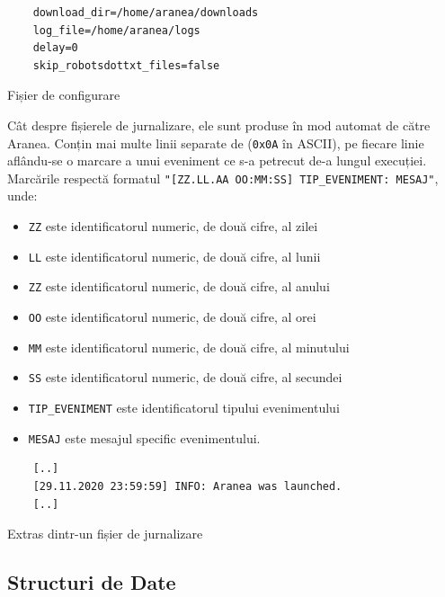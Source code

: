 \documentclass[12pt]{article}
\begin{document}
\begin{listing}[ht]
    \begin{verbatim}
    download_dir=/home/aranea/downloads
    log_file=/home/aranea/logs
    delay=0
    skip_robotsdottxt_files=false
    \end{verbatim}
    \caption{Fișier de configurare}
    \label{listing:1}
\end{listing}

Cât despre fișierele de jurnalizare, ele sunt produse în mod automat de către Aranea. Conțin mai multe linii separate de \texttt{\n} (\texttt{0x0A} în ASCII), pe fiecare linie aflându-se o marcare a unui eveniment ce s-a petrecut de-a lungul execuției. Marcările respectă formatul \texttt{"[ZZ.LL.AA OO:MM:SS] TIP_EVENIMENT: MESAJ"}, unde:
\begin{itemize}
    \item \texttt{ZZ} este identificatorul numeric, de două cifre, al zilei
    \item \texttt{LL} este identificatorul numeric, de două cifre, al lunii
    \item \texttt{ZZ} este identificatorul numeric, de două cifre, al anului
    \item \texttt{OO} este identificatorul numeric, de două cifre, al orei
    \item \texttt{MM} este identificatorul numeric, de două cifre, al minutului
    \item \texttt{SS} este identificatorul numeric, de două cifre, al secundei
    \item \texttt{TIP_EVENIMENT} este identificatorul tipului evenimentului
    \item \texttt{MESAJ} este mesajul specific evenimentului.
\end{itemize}

\begin{listing}[ht]
    \begin{verbatim}
    [..]
    [29.11.2020 23:59:59] INFO: Aranea was launched.
    [..]
    \end{verbatim}
    \caption{Extras dintr-un fișier de jurnalizare}
    \label{listing:1}
\end{listing}

\newpage

\subsection{Structuri de Date}
\end{document}
